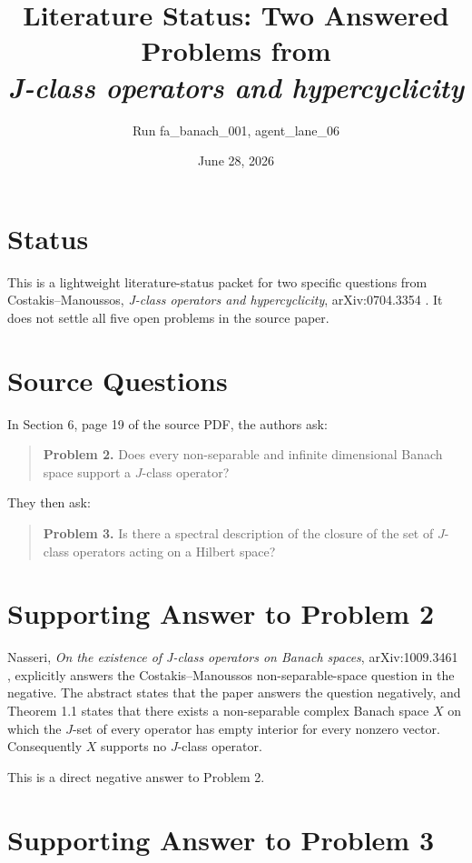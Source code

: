 \documentclass[11pt]{article}
\title{Literature Status: Two Answered Problems from\\
\emph{J-class operators and hypercyclicity}}
\author{Run fa\_banach\_001, agent\_lane\_06}
\date{June 28, 2026}
\begin{document}
\maketitle

\section*{Status}

This is a lightweight literature-status packet for two specific questions from
Costakis--Manoussos, \emph{J-class operators and hypercyclicity},
arXiv:0704.3354 \cite{CM}.  It does not settle all five open problems in the
source paper.

\section*{Source Questions}

In Section 6, page 19 of the source PDF, the authors ask:

\begin{quote}
\textbf{Problem 2.} Does every non-separable and infinite dimensional Banach
space support a \(J\)-class operator?
\end{quote}

They then ask:

\begin{quote}
\textbf{Problem 3.} Is there a spectral description of the closure of the set of
\(J\)-class operators acting on a Hilbert space?
\end{quote}

\section*{Supporting Answer to Problem 2}

Nasseri, \emph{On the existence of J-class operators on Banach spaces},
arXiv:1009.3461 \cite{Nasseri}, explicitly answers the Costakis--Manoussos
non-separable-space question in the negative.  The abstract states that the paper
answers the question negatively, and Theorem 1.1 states that there exists a
non-separable complex Banach space \(X\) on which the \(J\)-set of every operator
has empty interior for every nonzero vector.  Consequently \(X\) supports no
\(J\)-class operator.

This is a direct negative answer to Problem 2.

\section*{Supporting Answer to Problem 3}
\end{document}
